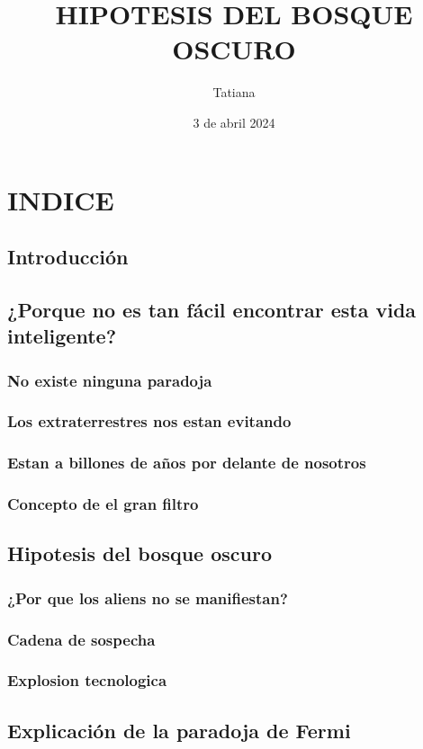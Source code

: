 \documentclass[12pt a4papel]{article}
\title{HIPOTESIS DEL BOSQUE OSCURO}
\author{Tatiana}
\date{3 de abril 2024}
\begin{document}
\maketitle
\section{INDICE}
\subsection{Introducción}
\subsection{¿Porque no es tan fácil encontrar esta vida inteligente?}
\subsubsection{No existe ninguna paradoja}
\subsubsection{Los extraterrestres nos estan evitando}
\subsubsection{Estan a billones de años por delante de nosotros}
\subsubsection{Concepto de el gran filtro}
\subsection{Hipotesis del bosque oscuro}
\subsubsection{¿Por que los aliens no se manifiestan?}
\subsubsection{Cadena de sospecha}
\subsubsection{Explosion tecnologica}
\subsection{Explicación de la paradoja de Fermi}
\end{document}
